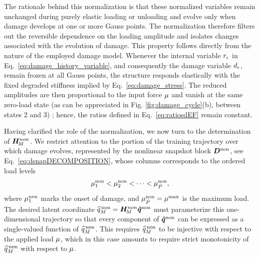 \documentclass[preprint,10pt]{elsarticle}  %
\begin{document}
The rationale behind this normalization  is that  these normalized variables
remain unchanged during purely elastic loading or unloading and evolve
only when damage develops at one or more Gauss points. The
normalization therefore filters out the reversible dependence on the
loading amplitude and isolates changes associated with the evolution
of damage. This property follows directly from the nature of the employed damage model. Whenever the
internal variable \(r_{\epsilon}\) in Eq.~\eqref{eq:damage_history_variable}, and consequently the damage variable
\(d_{\epsilon}\), remain frozen at all Gauss points, the structure responds
elastically with the fixed degraded stiffness implied by
Eq.~\ref{eq:damage_stress}. The reduced amplitudes are then proportional
to the input force $\mu$ and vanish at the same zero-load
state (as can be appreciated in Fig. \ref{fig:damage_cycle}(b), between states 2 and 3) ; hence, the ratios defined in Eq.~\ref{eq:ratiosdEF} remain
constant.






 Having clarified the role of the normalization, we now turn to the
determination of \(\bm{H}_{\!M}^{non}\). We restrict attention to the portion of
the training trajectory over which damage evolves, represented by the
nonlinear snapshot block \(\bm{D}^{\mathrm{non}}\), see Eq.~\ref{eq:dsnapDECOMPOSITION}, whose columns corresponds to the ordered load
levels
\begin{equation}
\label{eq:ordered}
\mu_{1}^{\mathrm{non}}
<
\mu_{2}^{\mathrm{non}}
<
\cdots
<
\mu_{\hat{P}}^{\mathrm{non}},
\end{equation}
where \(\mu_{1}^{\mathrm{non}}\) marks the onset of damage, and
\(\mu_{\hat{P}}^{\mathrm{non}} = \mu^{\mathrm{max}}\) is the maximum load. The desired latent coordinate
\(\widehat{q}^{\mathrm{\,non}}_{M}=\bm{H}_{\!M}^{non}\bm{\hat{q}}^{\mathrm{non}}\) must parameterize this one-dimensional
trajectory so that every component of \(\bm{\hat{q}}^{\mathrm{non}}\) can be expressed
as a single-valued function of \(\widehat{q}^{\mathrm{\,non}}_{M}\).  This requires \(\widehat{q}^{\mathrm{\,non}}_{M}\) to be injective with respect to the applied
load \(\mu\), which in this case  amounts to require strict monotonicity of
\(\widehat{q}^{\mathrm{\,non}}_{M}\) with respect to \(\mu\).
\end{document}
